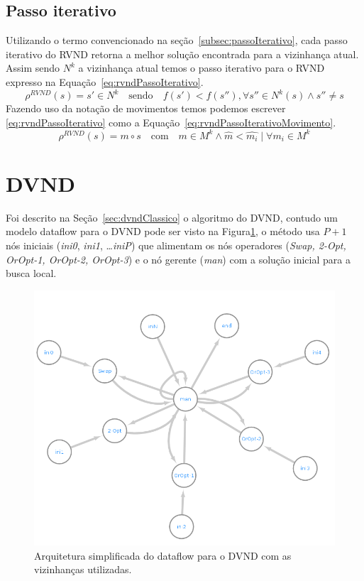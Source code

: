 \subsection{Passo iterativo}

Utilizando o termo convencionado na seção~\ref{subsec:passoIterativo}, cada passo iterativo do RVND retorna a melhor solução encontrada para a vizinhança atual.
Assim sendo $N^k$ a vizinhança atual temos o passo iterativo para o RVND expresso na Equação~\ref{eq:rvndPassoIterativo}.
\begin{equation} \label{eq:rvndPassoIterativo}
    \rho^{RVND}(s) = s' \in N^k \quad \textrm{sendo} \quad f(s') < f(s''), \forall s'' \in N^k(s) \land s'' \ne s
\end{equation}
Fazendo uso da notação de movimentos temos podemos escrever \ref{eq:rvndPassoIterativo} como a Equação~\ref{eq:rvndPassoIterativoMovimento}.
\begin{equation} \label{eq:rvndPassoIterativoMovimento}
    \rho^{RVND}(s) = m \circ s \quad \textrm{com} \quad m \in M^k \land \widehat{m} < \widehat{m_i} \mid \forall m_i \in M^k
\end{equation}

\section{DVND}\label{subsec:dvnd}

Foi descrito na Seção~\ref{sec:dvndClassico} o algoritmo do DVND, contudo um modelo dataflow para o DVND pode ser visto na Figura\ref{fig:dvndGraph}, o método usa $P + 1$ nós iniciais (\textit{ini0}, \textit{ini1}, \dots \textit{iniP}) que alimentam os nós operadores (\textit{Swap, 2-Opt, OrOpt-1, OrOpt-2, OrOpt-3}) e o nó gerente (\textit{man}) com a solução inicial para a busca local.

\begin{figure}[htbp]
    \centerline{\includegraphics[scale=0.6]{figuras/dvnd/DVND_dataflow_nomes.png}}
    \caption{Arquitetura simplificada do dataflow para o DVND com as vizinhanças utilizadas.}
    \label{fig:dvndGraph}
\end{figure}

